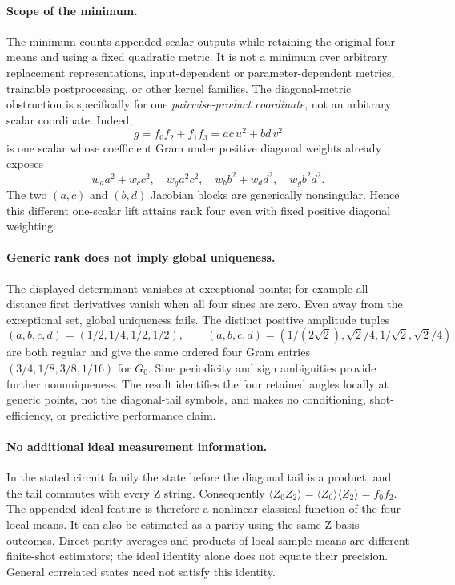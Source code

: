 \paragraph{Scope of the minimum.}
The minimum counts appended scalar outputs while retaining the
original four means and using a fixed quadratic metric. It is not a
minimum over arbitrary replacement representations, input-dependent
or parameter-dependent metrics, trainable postprocessing, or other
kernel families. The diagonal-metric obstruction is specifically
for one \emph{pairwise-product coordinate}, not an arbitrary scalar
coordinate. Indeed,
\[
 g=f_0f_2+f_1f_3=ac\,u^2+bd\,v^2
\]
is one scalar whose coefficient Gram under positive diagonal weights
already exposes
\[
 w_a a^2+w_c c^2,\quad w_g a^2c^2,\quad
 w_b b^2+w_d d^2,\quad w_g b^2d^2.
\]
The two $(a,c)$ and $(b,d)$ Jacobian blocks are generically
nonsingular. Hence this different one-scalar lift attains rank four
even with fixed positive diagonal weighting.

\paragraph{Generic rank does not imply global uniqueness.}
The displayed determinant vanishes at exceptional points; for
example all distance first derivatives vanish when all four sines
are zero. Even away from the exceptional set, global uniqueness
fails. The distinct positive amplitude tuples
\[
 (a,b,c,d)=(1/2,1/4,1/2,1/2),\qquad
 (a,b,c,d)=(1/(2\sqrt2),\sqrt2/4,1/\sqrt2,\sqrt2/4)
\]
are both regular and give the same ordered four Gram entries
$(3/4,1/8,3/8,1/16)$ for $G_0$. Sine periodicity and sign ambiguities
provide further nonuniqueness. The result identifies the four
retained angles locally at generic points, not the diagonal-tail
symbols, and makes no conditioning, shot-efficiency, or predictive
performance claim.

\paragraph{No additional ideal measurement information.}
In the stated circuit family the state before the diagonal tail is
a product, and the tail commutes with every Z string. Consequently
$\langle Z_0Z_2\rangle=\langle Z_0\rangle\langle Z_2\rangle=f_0f_2$.
The appended ideal feature is therefore a nonlinear classical
function of the four local means. It can also be estimated as a
parity using the same Z-basis outcomes. Direct parity averages and
products of local sample means are different finite-shot estimators;
the ideal identity alone does not equate their precision. General
correlated states need not satisfy this identity.

